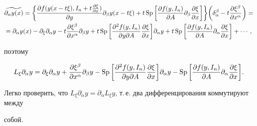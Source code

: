 \begin{gather*}


\widetilde {\partial_\alpha y(x)}=\bigg\{


\frac{\partial f(y(x-t\xi),I_n+t\frac{\partial \xi}{\partial x})}


{\partial y}\partial_\beta y(x-t\xi)+ 


t\SP\bigg[\frac{\partial f(y,I_n)}{\partial A}


\partial_\beta\frac{\partial \xi}{\partial x}\bigg]\bigg\}\bigg


(\delta^\beta_\alpha-t\frac{\partial \xi^\beta}{\partial x^\alpha}\bigg)= \\


%


=\partial_\alpha y(x)-\partial_\xi\partial_\alpha y-t


\frac{\partial \xi^\beta}{\partial x^\alpha}\partial_\beta y+


t\SP\bigg[\frac{\partial^2 f(y,I_n)}{\partial y\partial A}


\frac{\partial \xi}{\partial x}\bigg]\partial_\alpha y+


t\SP\bigg[\frac{\partial f(y,I_n)}{\partial A}


\partial_\alpha \frac{\partial \xi}


{\partial x}\bigg]+\dotsb,


\end{gather*}


поэтому


$$


L_\xi\partial_\alpha y=\partial_\xi\partial_\alpha y+


\frac{\partial \xi^\beta}{\partial x^\alpha}\partial_\beta y-


\SP\bigg[\frac{\partial^2 f(y,I_n)}{\partial y\partial A}


\frac{\partial \xi}{\partial x}\bigg]\partial_\alpha y-


\SP\bigg[\frac{\partial f(y,I_n)}{\partial A}


\partial_\alpha \frac{\partial \xi}{\partial x}\bigg].


$$


Легко проверить, что $L_\xi\partial_\alpha y= \partial_\alpha


L_\xi y$, т.\,е. два дифференцирования коммутируют между


собой.

















